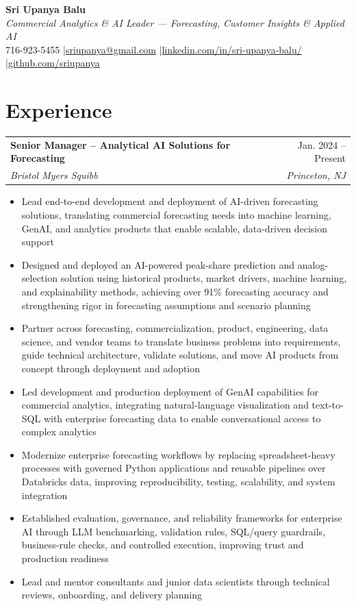 \documentclass[10pt,letterpaper]{article}
\makeatletter
\newcommand{\job}[4]{%
  \begin{tabularx}{\textwidth}{@{}Xr@{}}
    \textbf{#1} & #2 \\
    \textit{#3} & \textit{#4}
  \end{tabularx}\vspace{-2pt}
}
\makeatother
\begin{document}
\begin{center}
{\LARGE \textbf{Sri Upanya Balu}}\\[-1pt]
{\itshape Commercial Analytics \& AI Leader --- Forecasting, Customer Insights \& Applied AI}\\[4pt]
716-923-5455 \enspace|\enspace \href{mailto:sriupanya@gmail.com}{sriupanya@gmail.com} \enspace|\enspace \href{https://linkedin.com/in/sri-upanya-balu/}{linkedin.com/in/sri-upanya-balu/} \enspace|\enspace \href{https://github.com/sriupanya}{github.com/sriupanya}
\end{center}
\vspace{-4pt}

\section{Experience}
\job{Senior Manager -- Analytical AI Solutions for Forecasting}{Jan. 2024 -- Present}{Bristol Myers Squibb}{Princeton, NJ}
\begin{itemize}
\item Lead end-to-end development and deployment of AI-driven forecasting solutions, translating commercial forecasting needs into machine learning, GenAI, and analytics products that enable scalable, data-driven decision support
\item Designed and deployed an AI-powered peak-share prediction and analog-selection solution using historical products, market drivers, machine learning, and explainability methods, achieving over 91\% forecasting accuracy and strengthening rigor in forecasting assumptions and scenario planning
\item Partner across forecasting, commercialization, product, engineering, data science, and vendor teams to translate business problems into requirements, guide technical architecture, validate solutions, and move AI products from concept through deployment and adoption
\item Led development and production deployment of GenAI capabilities for commercial analytics, integrating natural-language visualization and text-to-SQL with enterprise forecasting data to enable conversational access to complex analytics
\item Modernize enterprise forecasting workflows by replacing spreadsheet-heavy processes with governed Python applications and reusable pipelines over Databricks data, improving reproducibility, testing, scalability, and system integration
\item Established evaluation, governance, and reliability frameworks for enterprise AI through LLM benchmarking, validation rules, SQL/query guardrails, business-rule checks, and controlled execution, improving trust and production readiness
\item Lead and mentor consultants and junior data scientists through technical reviews, onboarding, and delivery planning
\end{itemize}
\vspace{-2pt}
\end{document}
